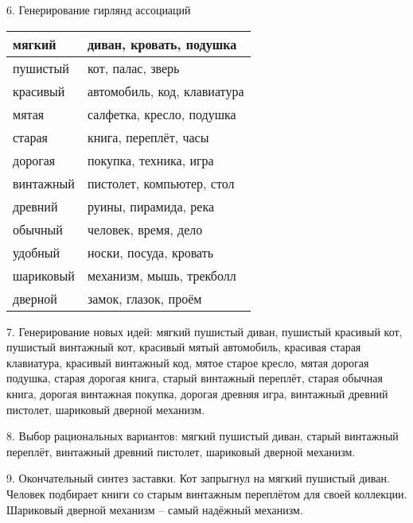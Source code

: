 6. Генерирование гирлянд ассоциаций

\begin{table}[h!]
    \center
    \begin{tabularx}{\textwidth}{|X|X|}
        мягкий & диван, кровать, подушка \\ \hline
        пушистый & кот, палас, зверь \\ \hline 
        красивый & автомобиль, код, клавиатура \\ \hline
        мятая & салфетка, кресло, подушка \\ \hline
        старая & книга, переплёт, часы \\ \hline
        дорогая & покупка, техника, игра \\ \hline
        винтажный & пистолет, компьютер, стол \\ \hline
        древний & руины, пирамида, река \\ \hline
        обычный & человек, время, дело \\ \hline
        удобный & носки, посуда, кровать \\ \hline
        шариковый & механизм, мышь, трекболл \\ \hline
        дверной & замок, глазок, проём \\ \hline
    \end{tabularx}
\end{table}

7. Генерирование новых идей: мягкий пушистый диван, пушистый красивый кот, пушистый винтажный кот, 
красивый мятый автомобиль, красивая старая клавиатура, красивый винтажный код, мятое старое кресло, 
мятая дорогая подушка, старая дорогая книга, старый винтажный переплёт, старая обычная книга, 
дорогая винтажная покупка, дорогая древняя игра, винтажный древний пистолет, шариковый дверной механизм.

8. Выбор рациональных вариантов: мягкий пушистый диван, старый винтажный переплёт, 
винтажный древний пистолет, шариковый дверной механизм.

9. Окончательный синтез заставки. Кот запрыгнул на мягкий пушистый диван. Человек подбирает книги со 
старым винтажным переплётом для своей коллекции. Шариковый дверной механизм -- самый надёжный механизм.

